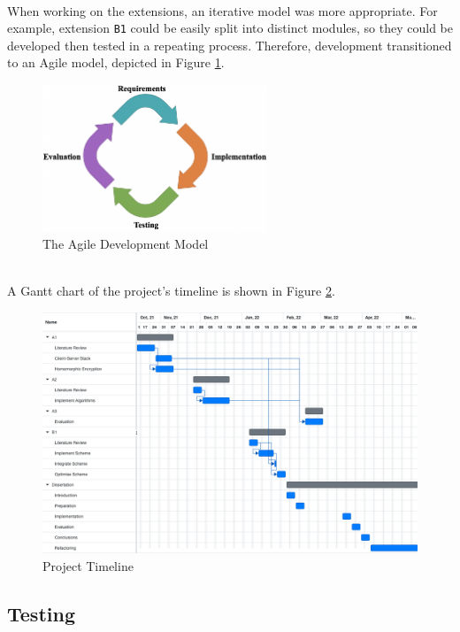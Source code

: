 \smallskip \\ \indent
When working on the extensions, an iterative model was more appropriate. For example, extension \texttt{B1} could be easily split into distinct modules, so they could be developed then tested in a repeating process. Therefore, development transitioned to an Agile model, depicted in Figure \ref{fig:agile}.
\begin{figure}[ht]
    \centering
    \includegraphics[width=0.6\textwidth]{figures/agile.png}
    \caption{The Agile Development Model}
    \label{fig:agile}
\end{figure}
\\ \indent
A Gantt chart of the project's timeline is shown in Figure \ref{fig:gantt}.
\begin{figure}[H]
    \centering
    \includegraphics[width=1\textwidth]{figures/gantt.png}
    \caption{Project Timeline}
    \label{fig:gantt}
\end{figure}


\setlength{\leftskip}{0cm}

\subsection{Testing}
\label{sec:testing}
